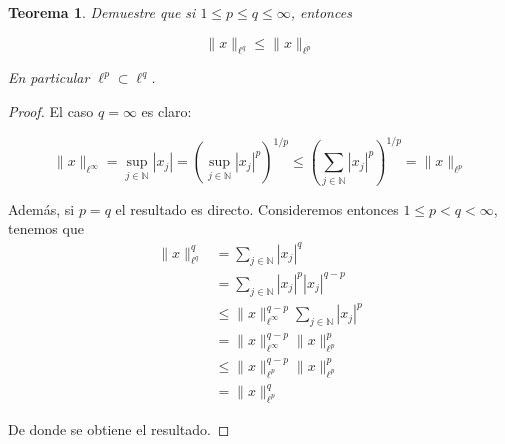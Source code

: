 \documentclass{article}
\newtheorem{teo}{Teorema}
\begin{document}
\begin{teo}
Demuestre que si $1 \leq p \leq q \leq \infty$, entonces

	$$\|x\|_{\ell^{q}} \leq \|x\|_{\ell^{p}}$$
	
En particular $\ell^{p} \subset \ell^{q}$.

\end{teo}

\begin{proof} El caso $q = \infty$ es claro:

	$$\|x\|_{\ell^{\infty}} 
		= 	\sup_{j \in \mathbb{N}} |x_{j}|
		= 	\left(\sup_{j \in \mathbb{N}} |x_{j}|^{p}\right)^{1/p} 
		\leq	\left(\sum_{j \in \mathbb{N}} |x_{j}|^{p}\right)^{1/p}
		=	\|x\|_{\ell^{p}}
	$$

Además, si $p = q$ el resultado es directo. Consideremos entonces $1 \leq p < q < \infty$, tenemos que
	\begin{align*}
		\|x\|_{\ell^{q}}^{q}
			&=		\sum_{j \in \mathbb{N}} |x_{j}|^{q}	\\
			&=		\sum_{j \in \mathbb{N}} |x_{j}|^{p} |x_{j}|^{q-p}	\\
			&\leq		\|x\|^{q-p}_{\ell^{\infty}} \sum_{j \in \mathbb{N}} |x_{j}|^{p}	\\
			&=		\|x\|^{q-p}_{\ell^{\infty}} \|x\|_{\ell^{p}}^{p}	\\
			&\leq		\|x\|^{q-p}_{\ell^{p}} \|x\|_{\ell^{p}}^{p}	\\
			&=		\|x\|_{\ell^{p}}^{q}		 
	\end{align*}

De donde se obtiene el resultado.

\end{proof}                                          

\end{document}
